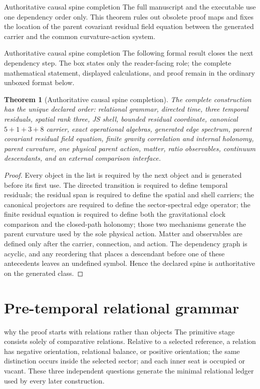 \documentclass[11pt]{article}
\numberwithin{equation}{section}
\newtheorem{theorem}[definition]{Theorem}
\theoremstyle{remark}
\begin{document}
\begin{proofguide}{Authoritative causal spine completion}
The full manuscript and the executable use one dependency order only. This theorem rules out obsolete proof maps and fixes the location of the parent covariant residual field equation between the generated carrier and the common curvature-action system.
\end{proofguide}
\begin{proofguide}{Authoritative causal spine completion}
The following formal result closes the next dependency step. The box states only the reader-facing role; the complete mathematical statement, displayed calculations, and proof remain in the ordinary unboxed format below.
\end{proofguide}
\begin{theorem}[Authoritative causal spine completion]
The complete construction has the unique declared order: relational grammar, directed time, three temporal residuals, spatial rank three, JS shell, bounded residual coordinate, canonical $5+1+3+8$ carrier, exact operational algebras, generated edge spectrum, parent covariant residual field equation, finite gravity correlation and internal holonomy, parent curvature, one physical parent action, matter, ratio observables, continuum descendants, and an external comparison interface.
\end{theorem}
\begin{proof}
Every object in the list is required by the next object and is generated before its first use. The directed transition is required to define temporal residuals; the residual span is required to define the spatial and shell carriers; the canonical projectors are required to define the sector-spectral edge operator; the finite residual equation is required to define both the gravitational clock comparison and the closed-path holonomy; those two mechanisms generate the parent curvature used by the sole physical action. Matter and observables are defined only after the carrier, connection, and action. The dependency graph is acyclic, and any reordering that places a descendant before one of these antecedents leaves an undefined symbol. Hence the declared spine is authoritative on the generated class.
\end{proof}
\section{Pre-temporal relational grammar}
\begin{conceptledger}{why the proof starts with relations rather than objects}
The primitive stage consists solely of comparative relations. Relative to a selected reference, a relation has negative orientation, relational balance, or positive orientation; the same distinction occurs inside the selected sector; and each inner seat is occupied or vacant. These three independent questions generate the minimal relational ledger used by every later construction.
\end{conceptledger}
\end{document}

